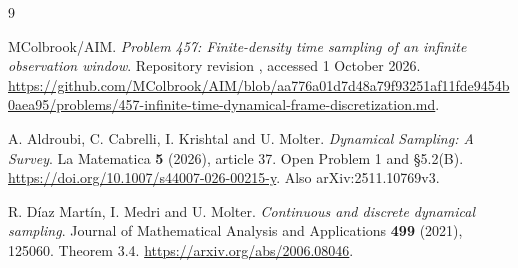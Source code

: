 \documentclass[11pt]{article}
\begin{document}
\begin{thebibliography}{9}
\raggedright\small
{}
MColbrook/AIM. \emph{Problem 457: Finite-density time sampling of an infinite observation window}.
Repository revision , accessed 1 October 2026.
\url{https://github.com/MColbrook/AIM/blob/aa776a01d7d48a79f93251af11fde9454b0aea95/problems/457-infinite-time-dynamical-frame-discretization.md}.

A. Aldroubi, C. Cabrelli, I. Krishtal and U. Molter.
\emph{Dynamical Sampling: A Survey}.
La Matematica \textbf{5} (2026), article 37.
Open Problem 1 and \S5.2(B).
\url{https://doi.org/10.1007/s44007-026-00215-y}.
Also arXiv:2511.10769v3.

R. D\'{i}az Mart\'{i}n, I. Medri and U. Molter.
\emph{Continuous and discrete dynamical sampling}.
Journal of Mathematical Analysis and Applications \textbf{499} (2021), 125060.
Theorem 3.4.
\url{https://arxiv.org/abs/2006.08046}.
\end{thebibliography}
\end{document}
